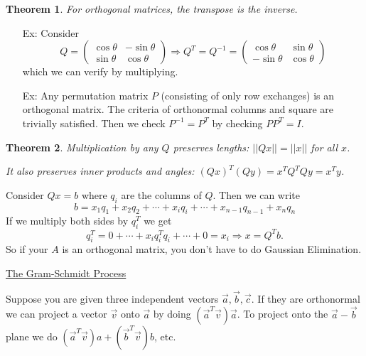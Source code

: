 \documentclass[reqno]{amsart}
\newtheorem{thm}{Theorem}
\theoremstyle{definition}
\begin{document}
\begin{thm}
For orthogonal matrices, the transpose is the inverse.
\end{thm}

\begin{itemize}

\item[Ex:  ]  Consider
%
\begin{equation*}
Q = \begin{pmatrix}
\cos\theta & -\sin\theta\\
\sin\theta & \cos\theta
\end{pmatrix} \Rightarrow Q^T = Q^{-1} = \begin{pmatrix}
\cos\theta & \sin\theta\\
-\sin\theta & \cos\theta
\end{pmatrix}
\end{equation*}
%
which we can verify by multiplying.

\item[Ex:  ]  Any permutation matrix $P$ (consisting of only row exchanges) is an orthogonal matrix.
The criteria of orthonormal columns and square are trivially satisfied.  Then we check $P^{-1} = P^T$
by checking $PP^T = I$.

\end{itemize}

\begin{thm}
Multiplication by any $Q$ preserves lengths:  $||Qx|| = ||x||$ for all $x$.

It also preserves inner products and angles:  $(Qx)^T(Qy) = x^TQ^TQy = x^Ty$.
\end{thm}

Consider $Qx = b$ where $q_i$ are the columns of $Q$.  Then we can write
%
\begin{equation*}
b = x_1q_1 + x_2q_2 + \cdots + x_iq_i + \cdots + x_{n-1}q_{n-1} + x_nq_n
\end{equation*}
%
If we multiply both sides by $q_i^T$ we get
%
\begin{equation*}
q_i^T = 0 + \cdots + x_iq_i^Tq_i + \cdots + 0 = x_i \Rightarrow x = Q^Tb.
\end{equation*}
%
So if your $A$ is an orthogonal matrix, you don't have to do Gaussian Elimination.

\underline{The Gram-Schmidt Process}

Suppose you are given three independent vectors $\vec{a}, \vec{b}, \vec{c}$.  If they are orthonormal
we can project a vector $\vec{v}$ onto $\vec{a}$ by doing $(\vec{a}^T\vec{v})\vec{a}$.  To project
onto the $\vec{a}-\vec{b}$ plane we do $(\vec{a}^T\vec{v})a + (\vec{b}^T\vec{v})b$, etc.
\end{document}

